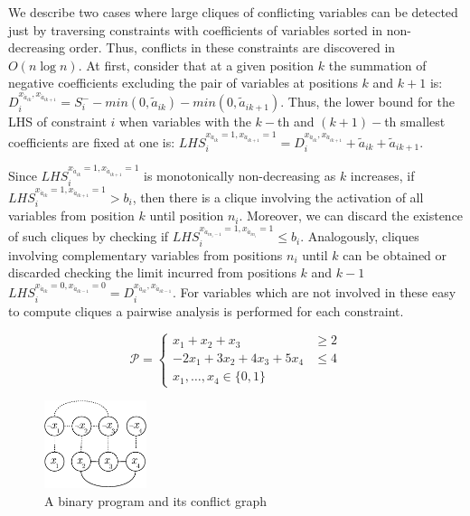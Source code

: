 \documentclass{endm}
\begin{document}
We describe two cases where large cliques of conflicting variables can be detected just by traversing constraints with  coefficients of variables sorted in non-decreasing order. Thus, conflicts in these constraints are discovered in $O( n \log n)$. At first, consider that at a given position $k$ the summation of negative coefficients excluding the pair of variables at positions $k$ and $k+1$ is: $\displaystyle D_{i}^{x_{\acute{a}_{ik}}, x_{\acute{a}_{ik+1}}} = S_i^- - min(0, \tilde{a}_{ik}) - min(0, \tilde{a}_{ik+1})$.  Thus, the lower bound for the LHS of constraint $i$ when variables with the $k-$th and $(k+1)-$th smallest coefficients are fixed at one is: $\displaystyle LHS_{i}^{x_{\acute{a}_{ik}} = 1, x_{\acute{a}_{ik+1}} = 1} = D_{i}^{x_{\acute{a}_{ik}}, x_{\acute{a}_{ik+1}}} + \tilde{a}_{ik} + \tilde{a}_{ik+1}$.

Since $LHS_{i}^{x_{\acute{a}_{ik}} = 1, x_{\acute{a}_{ik+1}} = 1}$ is monotonically non-decreasing as $k$ increases, if $LHS_{i}^{x_{\acute{a}_{ik}} = 1, x_{\acute{a}_{ik+1}} = 1} > b_{i}$, then there is a clique involving the activation of all variables from position $k$ until position $n_i$. Moreover, we can discard the existence of such cliques by checking if $LHS_{i}^{x_{\acute{a}_{in_i-1}} = 1, x_{\acute{a}_{in_i}} = 1} \leq b_i$. Analogously, cliques involving complementary variables from positions $n_i$ until $k$ can be obtained or discarded checking the limit incurred from positions $k$ and $k-1$  $LHS_{i}^{x_{\acute{a}_{ik}} = 0, x_{\acute{a}_{ik-1}} = 0} = D_{i}^{x_{\acute{a}_{ik}}, x_{\acute{a}_{ik-1}}} $. For variables which are not involved in these easy to compute cliques a pairwise analysis is performed for each constraint. 

\begin{figure}
{\small

\begin{minipage}[b]{.5\textwidth}
 \[ \mathcal{P} = \left\{
\begin{array}{lr}
x_1+x_2+x_3 & \geq 2 \\
-2x_{1}+3x_{2}+4x_{3}+5x_{4} & \leq 4 \\
x_{1},\ldots,x_{4}\in\{0,1\}
\end{array}
\right. \]
\end{minipage}
\begin{minipage}{.5\textwidth}
	\centering
	\includegraphics[width=3.0cm]{cGraph.pdf}
\end{minipage}
}
\caption{A binary program and its conflict graph}\label{graph}
\end{figure}
\end{document}
